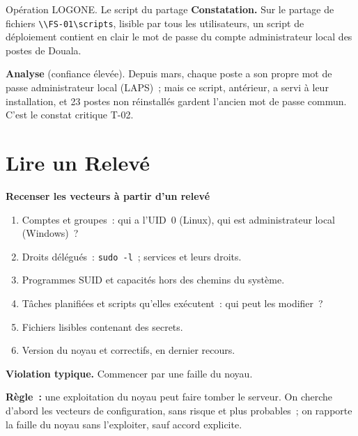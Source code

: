 \begin{boxscenario}{Opération LOGONE. Le script du partage}
\textbf{Constatation.} Sur le partage de fichiers \texttt{\textbackslash\textbackslash FS-01\textbackslash scripts},
lisible par tous les utilisateurs, un script de déploiement contient en
clair le mot de passe du compte administrateur local des postes de Douala.

\medskip
\textbf{Analyse} (confiance élevée). Depuis mars, chaque poste a son propre
mot de passe administrateur local (LAPS)~; mais ce script, antérieur, a
servi à leur installation, et 23 postes non réinstallés gardent l'ancien
mot de passe commun. C'est le constat critique T-02.
\end{boxscenario}

\section{Lire un Relevé}
\label{sec:c11-releve}

\begin{boxprocedure}
\textbf{Recenser les vecteurs à partir d'un relevé}
\begin{enumerate}
    \item Comptes et groupes~: qui a l'UID~0 (Linux), qui est administrateur
          local (Windows)~?
    \item Droits délégués~: \texttt{sudo -l}~; services et leurs droits.
    \item Programmes SUID et capacités hors des chemins du système.
    \item Tâches planifiées et scripts qu'elles exécutent~: qui peut les
          modifier~?
    \item Fichiers lisibles contenant des secrets.
    \item Version du noyau et correctifs, en dernier recours.
\end{enumerate}
\end{boxprocedure}

\begin{boxalert}
\textbf{Violation typique.} Commencer par une faille du noyau.

\smallskip
\textbf{Règle~:} une exploitation du noyau peut faire tomber le serveur. On
cherche d'abord les vecteurs de configuration, sans risque et plus
probables~; on rapporte la faille du noyau sans l'exploiter, sauf accord
explicite.
\end{boxalert}

